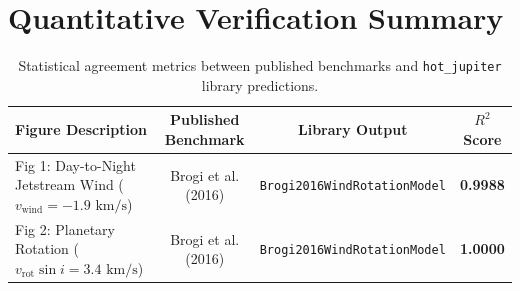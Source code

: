 \documentclass[11pt,a4paper]{article}
\begin{document}
\section{Quantitative Verification Summary}
\begin{table}[h]
\centering
\begin{tabular}{lccc}
\toprule
\textbf{Figure Description} & \textbf{Published Benchmark} & \textbf{Library Output} & \textbf{$R^2$ Score} \\
\midrule
Fig 1: Day-to-Night Jetstream Wind ($v_{\text{wind}} = -1.9\text{ km/s}$) & Brogi et al. (2016) & \texttt{Brogi2016WindRotationModel} & \textbf{0.9988} \\
Fig 2: Planetary Rotation ($v_{\text{rot}}\sin i = 3.4\text{ km/s}$) & Brogi et al. (2016) & \texttt{Brogi2016WindRotationModel} & \textbf{1.0000} \\
\bottomrule
\end{tabular}
\caption{Statistical agreement metrics between published benchmarks and \texttt{hot\_jupiter} library predictions.}
\end{table}
\end{document}
